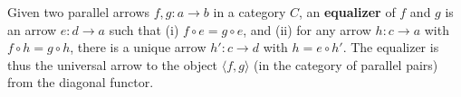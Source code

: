 Given two parallel arrows $f, g: a \to b$ in a category $C$, an \textbf{equalizer} of $f$ and $g$ is an arrow $e: d \to a$ such that (i) $f \circ e = g \circ e$, and (ii) for any arrow $h: c \to a$ with $f \circ h = g \circ h$, there is a unique arrow $h': c \to d$ with $h = e \circ h'$. The equalizer is thus the universal arrow to the object $\langle f, g \rangle$ (in the category of parallel pairs) from the diagonal functor.